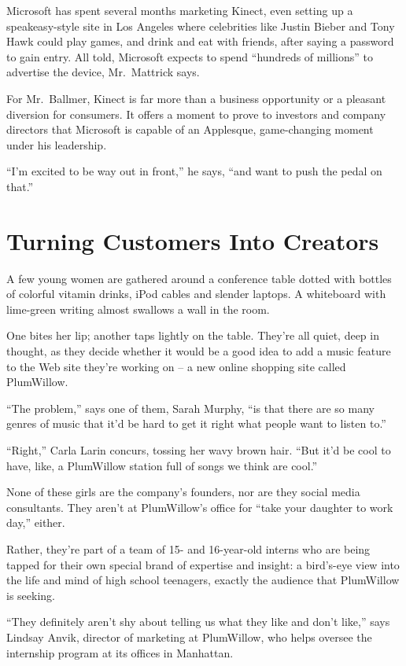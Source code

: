 ﻿\documentclass[12pt]{article}
\begin{document}
Microsoft has spent several months marketing Kinect, even setting up a speakeasy-style site in Los
Angeles where celebrities like Justin Bieber and Tony Hawk could play games, and drink and eat with
friends, after saying a password to gain entry. All told, Microsoft expects to spend ``hundreds of
millions'' to advertise the device, Mr.~Mattrick says.

For Mr.~Ballmer, Kinect is far more than a business opportunity or a pleasant diversion for
consumers. It offers a moment to prove to investors and company directors that Microsoft is capable
of an Applesque, game-changing moment under his leadership.

``I'm excited to be way out in front,'' he says, ``and want to push the pedal on that.''

\section{Turning Customers Into Creators}

\lettrine{A}{} few young women are gathered around a conference table dotted
with bottles of colorful vitamin drinks, iPod cables and slender laptops. A whiteboard with
lime-green writing almost swallows a wall in the room.

One bites her lip; another taps lightly on the table. They're all quiet, deep in thought, as they
decide whether it would be a good idea to add a music feature to the Web site they're working on --
a new online shopping site called PlumWillow.

``The problem,'' says one of them, Sarah Murphy, ``is that there are so many genres of music that
it'd be hard to get it right what people want to listen to.''

``Right,'' Carla Larin concurs, tossing her wavy brown hair. ``But it'd be cool to have, like, a
PlumWillow station full of songs we think are cool.''

None of these girls are the company's founders, nor are they social media consultants. They aren't
at PlumWillow's office for ``take your daughter to work day,'' either.

Rather, they're part of a team of 15- and 16-year-old interns who are being tapped for their own
special brand of expertise and insight: a bird's-eye view into the life and mind of high school
teenagers, exactly the audience that PlumWillow is seeking.

``They definitely aren't shy about telling us what they like and don't like,'' says Lindsay Anvik,
director of marketing at PlumWillow, who helps oversee the internship program at its offices in
Manhattan.
\end{document}
